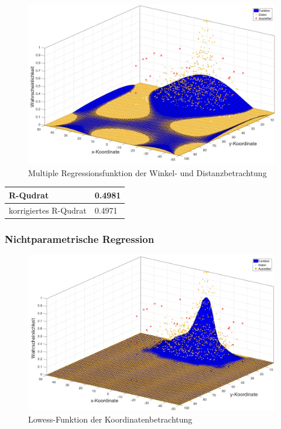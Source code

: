 \begin{figure}[H]
\centering
\includegraphics[scale=0.34]{se-wa-jpg/plotK}
\caption{Multiple Regressionsfunktion der Winkel- und Distanzbetrachtung}
\label{plotK}
\end{figure}

\tablehead{}
\tabletail{}
\tablelasttail{}
\begin{center}%
\begin{supertabular}{ | P{6cm} | P{3cm}  |}
\textsf{R-Qudrat} 	& 0.4981	\\
\hline
\textsf{korrigiertes R-Qudrat} 	&  0.4971	\\
\hline
\end{supertabular}
\end{center}

\subsubsection{Nichtparametrische Regression}
\begin{figure}[H]
\centering
\includegraphics[scale=0.34]{se-wa-jpg/splinek}
\caption{Lowess-Funktion der Koordinatenbetrachtung}
\label{splinek}
\end{figure}


